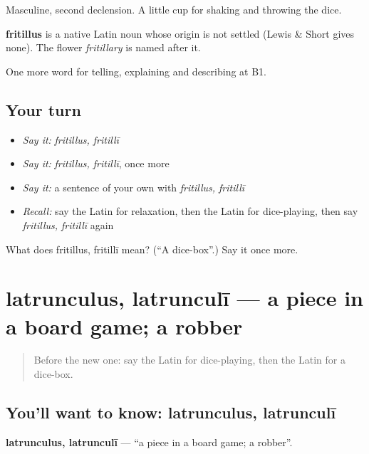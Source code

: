 Masculine, second declension. A little cup for shaking and throwing the dice.

\begin{cousinweb}
\textbf{fritillus} is a native Latin noun whose origin is not settled (Lewis \& Short gives none). The flower \emph{fritillary} is named after it.
\end{cousinweb}

\begin{grammarlens}[title={What you've built}]
One more word for telling, explaining and describing at B1.
\end{grammarlens}

\subsection*{Your turn}
\begin{itemize}
\raggedright
  \item \emph{Say it:} \emph{fritillus, fritillī}
  \item \emph{Say it:} \emph{fritillus, fritillī}, once more
  \item \emph{Say it:} a sentence of your own with \emph{fritillus, fritillī}
  \item \emph{Recall:} say the Latin for relaxation, then the Latin for dice-playing, then say \emph{fritillus, fritillī} again
\end{itemize}

\begin{tcolorbox}[breakable,colback=teal!4,colframe=teal!35!black,title={Before you move on}]
What does fritillus, fritillī mean? (\textquotedblleft{}A dice-box\textquotedblright{}.) Say it once more.
\end{tcolorbox}
\section[latrunculus, latrunculī]{latrunculus, latrunculī — a piece in a board game; a robber}

\label{lesson:LA-C539-latrunculus}



\begin{quote}
Before the new one: say the Latin for dice-playing, then the Latin for a dice-box.
\end{quote}

\subsection*{You'll want to know: latrunculus, latrunculī}
\textbf{latrunculus, latrunculī} — \textquotedblleft{}a piece in a board game; a robber\textquotedblright{}.

